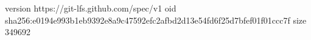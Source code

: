 version https://git-lfs.github.com/spec/v1
oid sha256:e0194e993b1eb9392e8a9c47592efc2afbd2d13e54fd6f25d7bfef01f01ccc7f
size 349692
